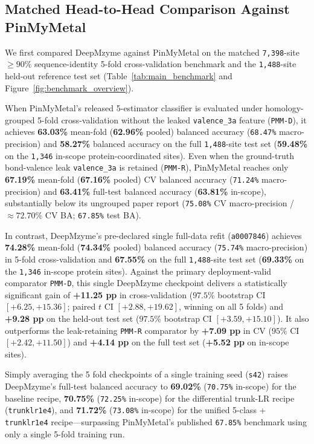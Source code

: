 \documentclass[10pt,a4paper,twocolumn]{article}
\begin{document}
\subsection{Matched Head-to-Head Comparison Against PinMyMetal}

We first compared DeepMzyme against PinMyMetal on the matched \texttt{7,398}-site $\ge 90\%$ sequence-identity 5-fold cross-validation benchmark and the \texttt{1,488}-site held-out reference test set (Table~\ref{tab:main_benchmark} and Figure~\ref{fig:benchmark_overview}).

When PinMyMetal's released 5-estimator classifier is evaluated under homology-grouped 5-fold cross-validation without the leaked \texttt{valence\_3a} feature (\texttt{PMM-D}), it achieves \textbf{63.03\%} mean-fold (\textbf{62.96\%} pooled) balanced accuracy (\texttt{68.47\%} macro-precision) and \textbf{58.27\%} balanced accuracy on the full \texttt{1,488}-site test set (\textbf{59.48\%} on the \texttt{1,346} in-scope protein-coordinated sites). Even when the ground-truth bond-valence leak \texttt{valence\_3a} is retained (\texttt{PMM-R}), PinMyMetal reaches only \textbf{67.19\%} mean-fold (\textbf{67.16\%} pooled) CV balanced accuracy (\texttt{71.24\%} macro-precision) and \textbf{63.41\%} full-test balanced accuracy (\textbf{63.81\%} in-scope), substantially below its ungrouped paper report (\texttt{75.08\%} CV macro-precision / $\approx 72.70\%$ CV BA; \texttt{67.85\%} test BA).

In contrast, DeepMzyme's pre-declared single full-data refit (\texttt{a0007846}) achieves \textbf{74.28\%} mean-fold (\textbf{74.34\%} pooled) balanced accuracy (\texttt{75.74\%} macro-precision) in 5-fold cross-validation and \textbf{67.55\%} on the full \texttt{1,488}-site test set (\textbf{69.33\%} on the \texttt{1,346} in-scope protein sites). Against the primary deployment-valid comparator \texttt{PMM-D}, this single DeepMzyme checkpoint delivers a statistically significant gain of \textbf{+11.25 pp} in cross-validation ($97.5\%$ bootstrap CI $[+6.25, +15.36]$; paired $t$ CI $[+2.88, +19.62]$, winning on all 5 folds) and \textbf{+9.28 pp} on the held-out test set ($97.5\%$ bootstrap CI $[+3.59, +15.10]$). It also outperforms the leak-retaining \texttt{PMM-R} comparator by \textbf{+7.09 pp} in CV ($95\%$ CI $[+2.42, +11.50]$) and \textbf{+4.14 pp} on the full test set (\textbf{+5.52 pp} on in-scope sites).

Simply averaging the 5 fold checkpoints of a single training seed (\texttt{s42}) raises DeepMzyme's full-test balanced accuracy to \textbf{69.02\%} (\texttt{70.75\%} in-scope) for the baseline recipe, \textbf{70.75\%} (\texttt{72.25\%} in-scope) for the differential trunk-LR recipe (\texttt{trunklr1e4}), and \textbf{71.72\%} (\texttt{73.08\%} in-scope) for the unified 5-class + \texttt{trunklr1e4} recipe---surpassing PinMyMetal's published \texttt{67.85\%} benchmark using only a single 5-fold training run.
\end{document}
